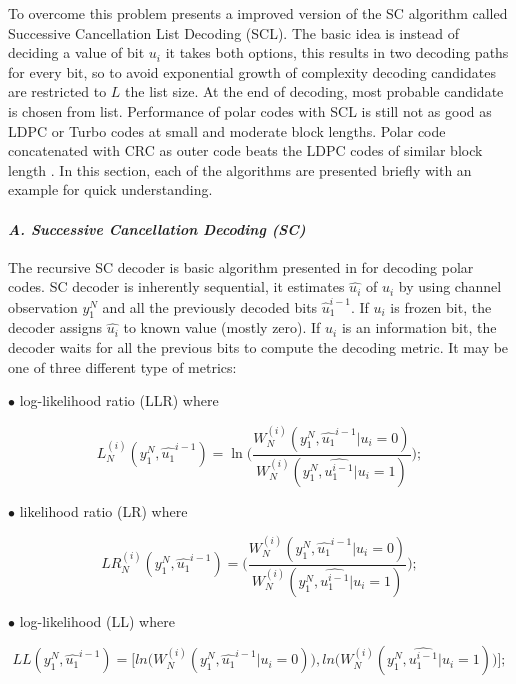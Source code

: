To overcome this problem \cite{SCL} presents a improved version of the SC algorithm called Successive Cancellation List Decoding (SCL). The basic idea is instead of deciding a value of bit $u_{i}$ it takes both options, this results in two decoding paths for every bit, so to avoid exponential growth of complexity decoding candidates are restricted to $L$ the list size. At the end of decoding, most probable candidate is chosen from list. Performance of polar codes with SCL is still not as good as LDPC or Turbo codes at small and moderate block lengths. Polar code concatenated with CRC as outer code beats the LDPC codes of similar block length \cite{SCL}. In this section, each of the algorithms are presented briefly with an example for quick understanding.

\paragraph{\emph{A. Successive Cancellation Decoding (SC)}}  \label{SC}
The recursive SC decoder is basic algorithm presented in \cite{Arikan} for decoding polar codes.  SC decoder is inherently sequential, it estimates $\hat{u_{i}}$ of $u_{i}$ by using channel observation $y^{N}_{1}$ and all the previously decoded bits $\hat{u}_{1}^{i-1}$. If $u_{i}$ is frozen bit, the decoder assigns $\hat{u_{i}}$ to known value (mostly zero). If $u_{i}$ is an information bit, the decoder waits for all the previous bits to compute the decoding metric. It may be one of three different type of metrics: \newline

$\bullet$ log-likelihood ratio (LLR) where


\begin{equation}
L_{N}^{(i)}(y_{1}^{N},\hat{u_{1}}^{i-1}) = \ln{\Bigg(\frac{W_{N}^{(i)}(y_{1}^{N},\hat{u_{1}}^{i-1}|u_{i} = 0)} {W_{N}^{(i)}(y_{1}^{N},\hat{u_{1}^{i-1}}|u_{i} = 1)}\Bigg)};
\end{equation}

$\bullet$ likelihood ratio (LR) where 

\begin{equation}
LR_{N}^{(i)}(y_{1}^{N},\hat{u_{1}}^{i-1}) = \Bigg(\frac{W_{N}^{(i)}(y_{1}^{N},\hat{u_{1}}^{i-1}|u_{i} = 0)} {W_{N}^{(i)}(y_{1}^{N},\hat{u_{1}^{i-1}}|u_{i} = 1)}\Bigg);
\end{equation}

$\bullet$ log-likelihood (LL) where 

\begin{equation}
LL(y_{1}^{N},\hat{u_{1}}^{i-1}) = \Big[ln\Big(W_{N}^{(i)}(y_{1}^{N},\hat{u_{1}}^{i-1}|u_{i} = 0)\Big), ln\Big(W_{N}^{(i)}(y_{1}^{N},\hat{u_{1}^{i-1}}|u_{i} = 1)\Big)\Big];
\end{equation}


